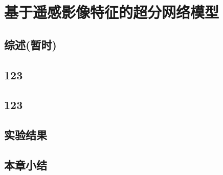 \section{基于遥感影像特征的超分网络模型}
\subsection{综述(暂时)}
\subsection{123}
\subsection{123}
\subsection{实验结果}
\subsection{本章小结}
